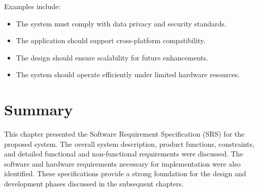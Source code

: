 Examples include:
\begin{itemize}
    \item The system must comply with data privacy and security standards.
    
    \item The application should support cross-platform compatibility.
    
    \item The design should ensure scalability for future enhancements.
    
    \item The system should operate efficiently under limited hardware resources.
\end{itemize}


\section{Summary}

This chapter presented the Software Requirement Specification (SRS) for the proposed system. The overall system description, product functions, constraints, and detailed functional and non-functional requirements were discussed. The software and hardware requirements necessary for implementation were also identified. These specifications provide a strong foundation for the design and development phases discussed in the subsequent chapters.
